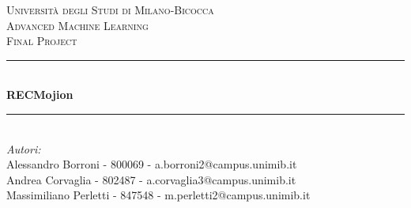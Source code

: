 \begin{titlepage}

\newcommand{\HRule}{\rule{\linewidth}{0.5mm}} %

\center %
 

\textsc{\LARGE Università degli Studi di Milano-Bicocca}\\[1cm] %
\textsc{\Large Advanced Machine Learning }\\[0.3cm] %
\textsc{\large Final Project}\\[0.1cm] %


\HRule \\[0.4cm]
{ \huge \bfseries RECMojion}\\[0.4cm] %
\HRule \\[1.5cm]
 

\large
\emph{Autori:}\\
Alessandro Borroni - 800069 - a.borroni2@campus.unimib.it \\   %
Andrea Corvaglia - 802487 - a.corvaglia3@campus.unimib.it \\
Massimiliano Perletti - 847548 - m.perletti2@campus.unimib.it  \\ [1cm] %




\end{titlepage}
